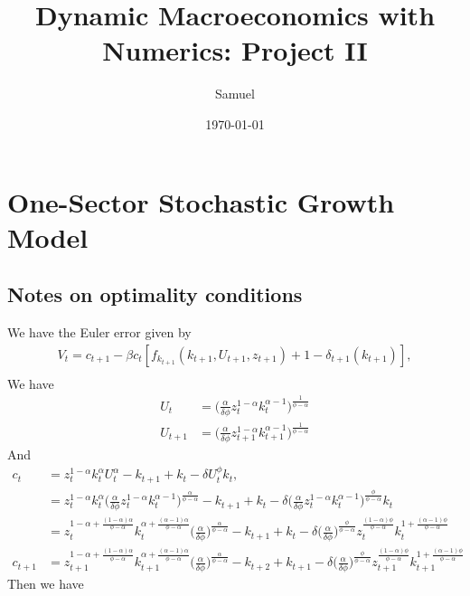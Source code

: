 \documentclass[a4paper]{article}
\title{Dynamic Macroeconomics with Numerics: Project II}
\author{Samuel}
\date{\today}
\theoremstyle{definition}
\begin{document}
\maketitle
\newpage
\section{One-Sector Stochastic Growth Model}
\subsection*{Notes on optimality conditions}
We have the Euler error given by
	\begin{align*}
	V_t = c_{t+1} - \beta c_t [f_{k_{t+1}}(k_{t+1},U_{t+1},z_{t+1})+1-\delta_{t+1}(k_{t+1})], \\
	\end{align*}
We have
	\begin{align*}
	U_t 		&= \Big( \frac{\alpha}{\delta\phi}z_t^{1-\alpha}k_{t}^{\alpha-1} \Big)^{\frac{1}{\phi-\alpha}} \\
	U_{t+1}	&= \Big( \frac{\alpha}{\delta\phi}z_{t+1}^{1-\alpha}k_{t+1}^{\alpha-1} \Big)^{\frac{1}{\phi-\alpha}}
	\end{align*}
And
	\begin{align*}
	c_t 		&= z_{t}^{1-\alpha}k_{t}^{\alpha}U_{t}^{\alpha} - k_{t+1} + k_{t} - \delta U_{t}^{\phi} k_{t}, \\
				&= z_{t}^{1-\alpha}k_{t}^{\alpha}\Big( \frac{\alpha}{\delta\phi}z_t^{1-\alpha}k_{t}^{\alpha-1} \Big)^{\frac{\alpha}{\phi-\alpha}}-k_{t+1}+k_{t}-\delta \Big( \frac{\alpha}{\delta\phi}z_t^{1-\alpha}k_{t}^{\alpha-1} \Big)^{\frac{\phi}{\phi-\alpha}}k_{t} \\
				&= z_{t}^{1-\alpha+\frac{(1-\alpha)\alpha}{\phi-\alpha}} k_{t}^{\alpha+\frac{(\alpha-1)\alpha}{\phi-\alpha}} \Big( \frac{\alpha}{\delta\phi} \Big)^{\frac{\alpha}{\phi-\alpha}}-k_{t+1} + k_{t} - \delta \Big( \frac{\alpha}{\delta\phi} \Big)^{\frac{\phi}{\phi-\alpha}}z_{t}^{\frac{(1-\alpha)\phi}{\phi-\alpha}}k_{t}^{1+\frac{(\alpha-1)\phi}{\phi-\alpha}}  \\
	c_{t+1}	&= z_{t+1}^{1-\alpha+\frac{(1-\alpha)\alpha}{\phi-\alpha}} k_{t+1}^{\alpha+\frac{(\alpha-1)\alpha}{\phi-\alpha}} \Big( \frac{\alpha}{\delta\phi} \Big)^{\frac{\alpha}{\phi-\alpha}}-k_{t+2} + k_{t+1} - \delta \Big( \frac{\alpha}{\delta\phi} \Big)^{\frac{\phi}{\phi-\alpha}}z_{t+1}^{\frac{(1-\alpha)\phi}{\phi-\alpha}}k_{t+1}^{1+\frac{(\alpha-1)\phi}{\phi-\alpha}}		
	\end{align*}	
Then we have
\end{document}
